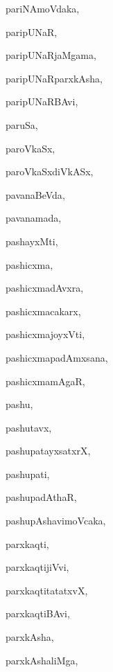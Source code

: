 \begin{multicols}{3}
{\noindent
{pariNAmoVdaka}, \pageref{pariNAmoVdaka}

\noindent
{paripUNaR}, \pageref{paripUNaR}

\noindent
{paripUNaRjaMgama}, \pageref{paripUNaRjaMgama}

\noindent
{paripUNaRparxkAsha}, \pageref{paripUNaRparxkAsha}

\noindent
{paripUNaRBAvi}, \pageref{paripUNaRBAvi}

\noindent
{paruSa}, \pageref{paruSa}

\noindent
{paroVkaSx}, \pageref{paroVkaSx}

\noindent
{paroVkaSxdiVkASx}, \pageref{paroVkaSxdiVkASx}

\noindent
{pavanaBeVda}, \pageref{pavanaBeVda}

\noindent
{pavanamada}, \pageref{pavanamada}

\noindent
{pashayxMti}, \pageref{pashayxMti}

\noindent
{pashicxma}, \pageref{pashicxma}

\noindent
{pashicxmadAvxra}, \pageref{pashicxmadAvxra}

\noindent
{pashicxmacakarx}, \pageref{pashicxmacakarx}

\noindent
{pashicxmajoyxVti}, \pageref{pashicxmajoyxVti}

\noindent
{pashicxmapadAmxsana}, \pageref{pashicxmapadAmxsana}

\noindent
{pashicxmamAgaR}, \pageref{pashicxmamAgaR}

\noindent
{pashu}, \pageref{pashu}

\noindent
{pashutavx}, \pageref{pashutavx}

\noindent
{pashupatayxsatxrX}, \pageref{pashupatayxsatxrX}

\noindent
{pashupati}, \pageref{pashupati}

\noindent
{pashupadAthaR}, \pageref{pashupadAthaR}

\noindent
{pashupAshavimoVcaka}, \pageref{pashupAshavimoVcaka}

\noindent
{parxkaqti}, \pageref{parxkaqti}

\noindent
{parxkaqtijiVvi}, \pageref{parxkaqtijiVvi}

\noindent
{parxkaqtitatatxvX}, \pageref{parxkaqtitatatxvX}

\noindent
{parxkaqtiBAvi}, \pageref{parxkaqtiBAvi}

\noindent
{parxkAsha}, \pageref{parxkAsha}

\noindent
{parxkAshaliMga}, \pageref{parxkAshaliMga}

}
\end{multicols}
